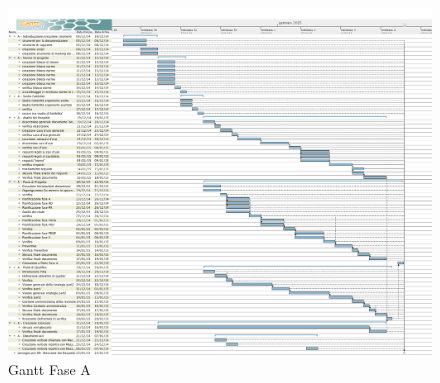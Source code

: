 	\begin{figure}[H]\centering
		\includegraphics[width=\textwidth]{PianoDiProgetto/Pics/FaseA.png}
	\caption{Gantt Fase A}
\end{figure}
